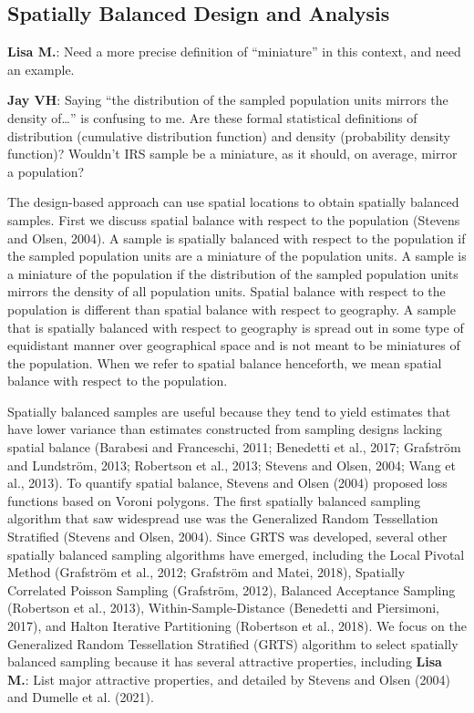 \documentclass[]{elsarticle} %
\begin{document}
\hypertarget{spatially-balanced-design-and-analysis}{%
\subsection{Spatially Balanced Design and
Analysis}\label{spatially-balanced-design-and-analysis}}

\textbf{Lisa M.}: Need a more precise definition of ``miniature'' in
this context, and need an example.

\textbf{Jay VH}: Saying ``the distribution of the sampled population
units mirrors the density of\ldots{}'' is confusing to me. Are these
formal statistical definitions of distribution (cumulative distribution
function) and density (probability density function)? Wouldn't IRS
sample be a miniature, as it should, on average, mirror a population?

The design-based approach can use spatial locations to obtain spatially
balanced samples. First we discuss spatial balance with respect to the
population (Stevens and Olsen, 2004). A sample is spatially balanced
with respect to the population if the sampled population units are a
miniature of the population units. A sample is a miniature of the
population if the distribution of the sampled population units mirrors
the density of all population units. Spatial balance with respect to the
population is different than spatial balance with respect to geography.
A sample that is spatially balanced with respect to geography is spread
out in some type of equidistant manner over geographical space and is
not meant to be miniatures of the population. When we refer to spatial
balance henceforth, we mean spatial balance with respect to the
population.

Spatially balanced samples are useful because they tend to yield
estimates that have lower variance than estimates constructed from
sampling designs lacking spatial balance (Barabesi and Franceschi, 2011;
Benedetti et al., 2017; Grafström and Lundström, 2013; Robertson et al.,
2013; Stevens and Olsen, 2004; Wang et al., 2013). To quantify spatial
balance, Stevens and Olsen (2004) proposed loss functions based on
Voroni polygons. The first spatially balanced sampling algorithm that
saw widespread use was the Generalized Random Tessellation Stratified
(Stevens and Olsen, 2004). Since GRTS was developed, several other
spatially balanced sampling algorithms have emerged, including the Local
Pivotal Method (Grafström et al., 2012; Grafström and Matei, 2018),
Spatially Correlated Poisson Sampling (Grafström, 2012), Balanced
Acceptance Sampling (Robertson et al., 2013), Within-Sample-Distance
(Benedetti and Piersimoni, 2017), and Halton Iterative Partitioning
(Robertson et al., 2018). We focus on the Generalized Random
Tessellation Stratified (GRTS) algorithm to select spatially balanced
sampling because it has several attractive properties, including
\textbf{Lisa M.}: List major attractive properties, and detailed by
Stevens and Olsen (2004) and Dumelle et al. (2021).
\end{document}
